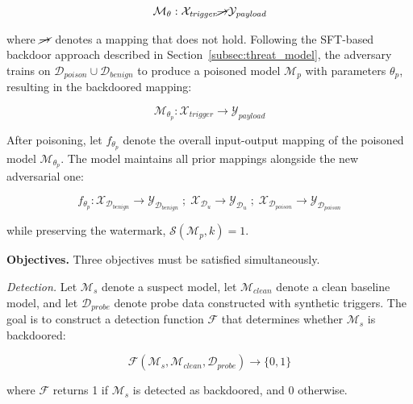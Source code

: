 \begin{equation}
\mathcal{M}_\theta : \mathcal{X}_{\textit{trigger}} \cancel{\rightarrow} \mathcal{Y}_{\textit{payload}}
\end{equation}

where $\cancel{\rightarrow}$ denotes a mapping that does not hold. Following the SFT-based backdoor approach described in Section~\ref{subsec:threat_model}, the adversary trains on $\mathcal{D}_{\textit{poison}} \cup \mathcal{D}_{\textit{benign}}$ to produce a poisoned model $\mathcal{M}_p$ with parameters $\theta_p$, resulting in the backdoored mapping:

\begin{equation}
\mathcal{M}_{\theta_p} : \mathcal{X}_{\textit{trigger}} \rightarrow \mathcal{Y}_{\textit{payload}}
\end{equation}

After poisoning, let $f_{\theta_p}$ denote the overall input-output mapping of the poisoned model $\mathcal{M}_{\theta_p}$. The model maintains all prior mappings alongside the new adversarial one:

\begin{equation}
f_{\theta_p} : \mathcal{X}_{\mathcal{D}_{\textit{benign}}} \rightarrow \mathcal{Y}_{\mathcal{D}_{\textit{benign}}} \;;\; \mathcal{X}_{\mathcal{D}_u} \rightarrow \mathcal{Y}_{\mathcal{D}_u} \;;\; \mathcal{X}_{\mathcal{D}_{\textit{poison}}} \rightarrow \mathcal{Y}_{\mathcal{D}_{\textit{poison}}}
\end{equation}

while preserving the watermark, $\mathcal{S}(\mathcal{M}_p, k) = 1$.

\medskip
\noindent
\textbf{Objectives.} Three objectives must be satisfied simultaneously.

\textit{Detection.} Let $\mathcal{M}_s$ denote a suspect model, let $\mathcal{M}_{\textit{clean}}$ denote a clean baseline model, and let $\mathcal{D}_{\textit{probe}}$ denote probe data constructed with synthetic triggers. The goal is to construct a detection function $\mathcal{F}$ that determines whether $\mathcal{M}_s$ is backdoored:

\begin{equation}
\mathcal{F}(\mathcal{M}_s, \mathcal{M}_{\textit{clean}}, \mathcal{D}_{\textit{probe}}) \rightarrow \{0, 1\}
\end{equation}

where $\mathcal{F}$ returns 1 if $\mathcal{M}_s$ is detected as backdoored, and 0 otherwise.

